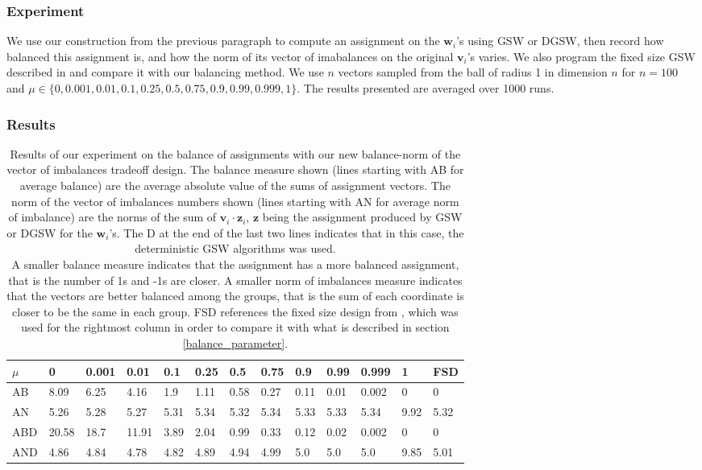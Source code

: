 \documentclass[12pt]{article}
\begin{document}
\subsubsection{Experiment}
We use our construction from the previous paragraph to compute an assignment on the $\textbf{w}_i$'s using GSW or DGSW, then record how balanced this assignment is, and how the norm of its vector of imabalances on the original $\textbf{v}_i$'s varies. We also program the fixed size GSW described in \cite{harshaw2019balancing} and compare it with our balancing method. We use $n$ vectors sampled from the ball of radius 1 in dimension $n$ for $n=100$ and $\mu\in\{0,0.001,0.01,0.1,0.25,0.5,0.75,0.9,0.99,0.999,1\}$. The results presented are averaged over 1000 runs.

\subsubsection{Results}
\begin{table}[h!]
\centering
\caption{Results of our experiment on the balance of assignments with our new balance-norm of the vector of imbalances tradeoff design. The balance measure shown (lines starting with AB for average balance) are the average absolute value of the sums of assignment vectors. The norm of the vector of imbalances numbers shown (lines starting with AN for average norm of imbalance) are the norms of the sum of $\textbf{v}_i\cdot \textbf{z}_i$, $\textbf{z}$ being the assignment produced by GSW or DGSW for the $\textbf{w}_i$'s. %
The D at the end of the last two lines indicates that in this case, the deterministic GSW algorithms was used.\\
A smaller balance measure indicates that the assignment has a more balanced assignment, that is the number of 1s and -1s are closer. A smaller norm of imbalances measure indicates that the vectors are better balanced among the groups, that is the sum of each coordinate is closer to be the same in each group. FSD references the fixed size design from \cite{harshaw2019balancing}, which was used for the rightmost column in order to compare it with what is described in section \ref{balance_parameter}.}
\begin{tabular}{l|llllllllllll}
 $\mu$ &0&0.001&0.01&0.1&0.25&0.5&0.75&0.9&0.99&0.999&1&FSD\\
\hline
AB&8.09&6.25&4.16&1.9&1.11&0.58&0.27&0.11&0.01&0.002&0&0 \\
AN&5.26&5.28&5.27&5.31&5.34&5.32&5.34&5.33&5.33&5.34&9.92&5.32\\
ABD&20.58&18.7&11.91&3.89&2.04&0.99&0.33&0.12&0.02&0.002&0&0\\
AND&4.86&4.84&4.78&4.82&4.89&4.94&4.99&5.0&5.0&5.0&9.85&5.01
\end{tabular}
\label{balance_tradeoff_results}
\end{table}
\end{document}
